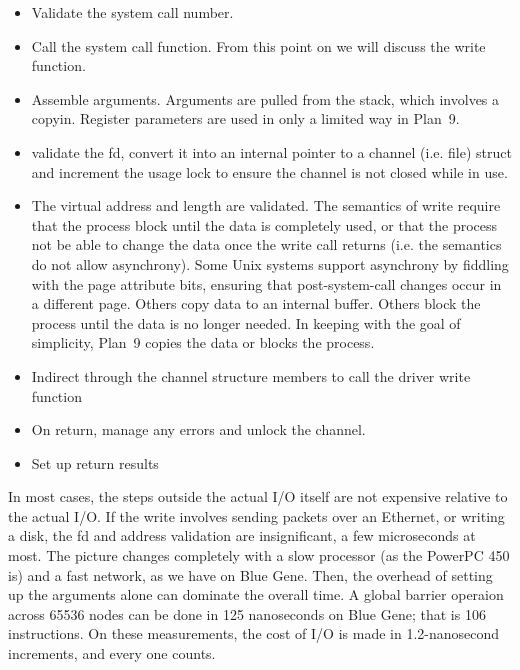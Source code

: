 \documentclass[letterpaper,twocolumn,10pt]{article}
\begin{document}
\begin{itemize}
\item Validate the system call number.
\item Call the system call function. From this point on we will discuss the write function. 
\item Assemble arguments. Arguments are pulled from the stack, which involves a copyin. Register parameters are used in only a limited way in Plan~9. 
\item validate the fd, convert it into an internal pointer to a channel (i.e. file) struct and increment the usage lock to ensure the channel is not closed while in use. 
\item The virtual address and length are validated. The semantics of write require that the process block 
until the data is completely used, or that the process not be able to change the data once the write call returns (i.e. 
the semantics do not allow asynchrony). Some Unix systems support asynchrony by fiddling with the 
page attribute bits, ensuring that post-system-call changes occur in a different page. Others copy data to an internal buffer. Others block the process until the data is no longer needed. 
In keeping with the goal of simplicity, Plan~9 copies the data or blocks the process. 
\item Indirect through the channel structure members to call the driver write function
\item On return, manage any errors and unlock the channel. 
\item Set up return results
\end{itemize}

In most cases, the steps outside the actual I/O itself are not expensive relative to the actual I/O. If the write involves
sending packets over an Ethernet, or writing a disk, the fd and address validation are insignificant, a few microseconds at most. The picture changes completely with a slow processor (as the PowerPC 450 is) and a fast network, as we have on Blue Gene. Then, the overhead of setting up the arguments alone can dominate the overall time. A global barrier operaion across 65536 nodes can be done in 125 nanoseconds 
on Blue Gene; that is 106 instructions. On these measurements, the cost of I/O is made in 1.2-nanosecond increments, and every one counts. 
\end{document}
